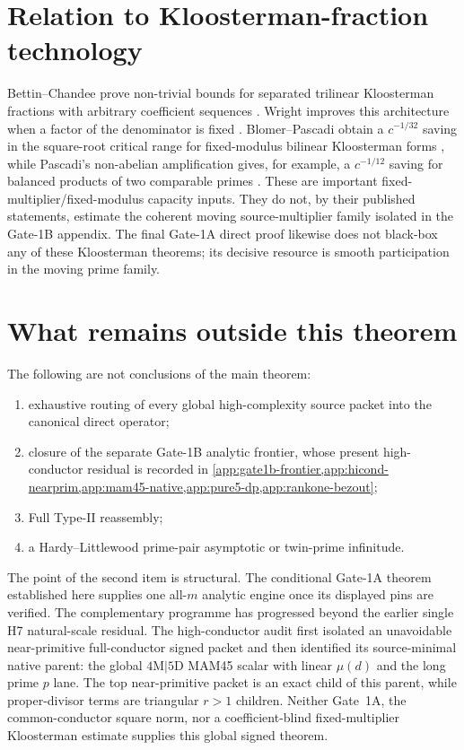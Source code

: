 \documentclass[11pt]{article}
\theoremstyle{definition}
\newcommand{\1}{\mathbf 1}
\begin{document}
\section{Relation to Kloosterman-fraction technology}
Bettin--Chandee prove non-trivial bounds for separated trilinear Kloosterman
fractions with arbitrary coefficient sequences \cite{BettinChandee2015}.
Wright improves this architecture when a factor of the denominator is fixed
\cite{Wright2026}.  Blomer--Pascadi obtain a $c^{-1/32}$ saving in the
square-root critical range for fixed-modulus bilinear Kloosterman forms
\cite{BlomerPascadi2026}, while Pascadi's non-abelian amplification gives, for
example, a $c^{-1/12}$ saving for balanced products of two comparable primes
\cite{Pascadi2025}.  These are important fixed-multiplier/fixed-modulus
capacity inputs.  They do not, by their published statements, estimate the
coherent moving source-multiplier family isolated in the Gate-1B appendix.
The final Gate-1A direct proof likewise does not black-box any of these
Kloosterman theorems; its decisive resource is smooth participation in the
moving prime family.

\section{What remains outside this theorem}
The following are not conclusions of the main theorem:
\begin{enumerate}
  \item exhaustive routing of every global high-complexity source packet into
        the canonical direct operator;
  \item closure of the separate Gate-1B analytic frontier, whose present
        high-conductor residual is recorded in \cref{app:gate1b-frontier,app:hicond-nearprim,app:mam45-native,app:pure5-dp,app:rankone-bezout};
  \item Full Type-II reassembly;
  \item a Hardy--Littlewood prime-pair asymptotic or twin-prime infinitude.
\end{enumerate}

The point of the second item is structural.  The conditional Gate-1A theorem
established here supplies one all-$m$ analytic engine once its displayed pins
are verified.  The complementary programme has progressed beyond the earlier
single H7 natural-scale residual.  The high-conductor audit first isolated an
unavoidable near-primitive full-conductor signed packet and then identified its
source-minimal native parent: the global $4$M$\mid5$D MAM45 scalar with linear
$\mu(d)$ and the long prime $p$ lane.  The top near-primitive packet is an exact
child of this parent, while proper-divisor terms are triangular $r>1$ children.
Neither Gate~1A, the common-conductor square norm, nor a coefficient-blind
fixed-multiplier Kloosterman estimate supplies this global signed theorem.
\end{document}
